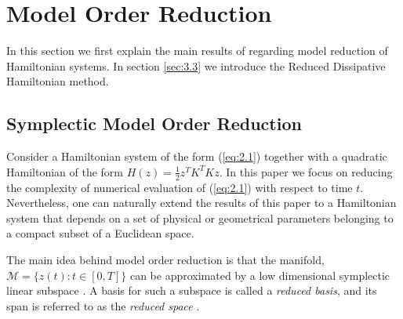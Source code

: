 \section{Model Order Reduction} \label{sec:3}
In this section we first explain the main results of \cite{Peng:2014di} regarding model reduction of Hamiltonian systems. In section \ref{sec:3.3} we introduce the Reduced Dissipative Hamiltonian method.

\subsection{Symplectic Model Order Reduction} \label{sec:3.1}
Consider a Hamiltonian system of the form (\ref{eq:2.1}) together with a quadratic Hamiltonian of the form $H(z) = \frac 1 2 z^T K^T K z$. In this paper we focus on reducing the complexity of numerical evaluation of (\ref{eq:2.1}) with respect to time $t$. Nevertheless, one can naturally extend the results of this paper to a Hamiltonian system that depends on a set of physical or geometrical parameters belonging to a compact subset of a Euclidean space.

The main idea behind model order reduction is that the manifold, $\mathcal M = \{ z(t) : t \in [0,T] \}$ can be approximated by a low dimensional symplectic linear subspace \cite{hesthaven2015certified,quarteroni2015reduced}. A basis for such a subspace is called a \emph{reduced basis}, and its span is referred to as the \emph{reduced space} \cite{hesthaven2015certified}.

